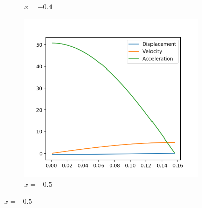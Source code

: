 \documentclass[12pt, letterpaper]{article}
\begin{document}
\begin{figure}[h]
\begin{subfigure}[b]{.3\linewidth}
    \caption{$x=-0.4$}
  \end{subfigure}
  \begin{subfigure}[b]{.3\linewidth}
    \includegraphics[width=\linewidth]{Hooke/hooke7000-0_5.png}
    \caption{$x=-0.5$}
  \end{subfigure}
\end{figure}
\end{document}
